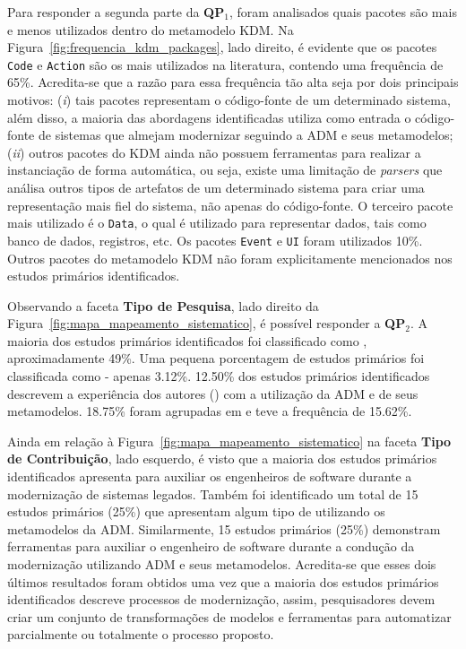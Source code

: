 Para responder a segunda parte da \textbf{QP$_1$}, foram analisados quais pacotes são mais e menos utilizados dentro do metamodelo KDM. Na Figura~\ref{fig:frequencia_kdm_packages}, lado direito, é evidente que os pacotes \texttt{Code} e \texttt{Action} são os mais utilizados na literatura, contendo uma frequência de 65\%. Acredita-se que a razão para essa frequência tão alta seja por dois principais motivos: (\textit{i}) tais pacotes representam o código-fonte de um determinado sistema, além disso, a maioria das abordagens identificadas utiliza como entrada o código-fonte de sistemas que almejam modernizar seguindo a ADM e seus metamodelos; (\textit{ii}) outros pacotes do KDM ainda não possuem ferramentas para realizar a instanciação de forma automática, ou seja, existe uma limitação de \textit{parsers} que análisa outros tipos de artefatos de um determinado sistema para criar uma representação mais fiel do sistema, não apenas do código-fonte. O terceiro pacote mais utilizado é o \texttt{Data}, o qual é utilizado para representar dados,  tais como banco de dados, registros, etc. Os pacotes \texttt{Event} e \texttt{UI} foram utilizados 10\%. Outros pacotes do metamodelo KDM não foram explicitamente mencionados nos estudos primários identificados.

Observando a faceta \textbf{Tipo de Pesquisa}, lado direito da Figura~\ref{fig:mapa_mapeamento_sistematico}, é possível responder a \textbf{QP$_2$}. A maioria dos estudos primários identificados foi classificado como , aproximadamente 49\%. Uma pequena porcentagem de estudos primários foi classificada como  - apenas 3.12\%. 12.50\% dos estudos primários identificados descrevem a experiência dos autores () com a utilização da ADM e de seus metamodelos. 18.75\% foram agrupadas em  e  teve a frequência de 15.62\%.

Ainda em relação à Figura~\ref{fig:mapa_mapeamento_sistematico} na faceta \textbf{Tipo de Contribuição}, lado esquerdo, é visto que a maioria dos estudos primários identificados apresenta  para auxiliar os engenheiros de software durante a modernização de sistemas legados. Também foi identificado um total de 15 estudos primários (25\%) que apresentam algum tipo de  utilizando os metamodelos da ADM. Similarmente, 15 estudos primários (25\%) demonstram ferramentas para auxiliar o engenheiro de software durante a condução da modernização utilizando ADM e seus metamodelos. Acredita-se que esses dois últimos resultados foram obtidos uma vez que a maioria dos estudos primários identificados descreve processos de modernização, assim, pesquisadores devem criar um conjunto de transformações de modelos e ferramentas para automatizar parcialmente ou totalmente o processo proposto.

